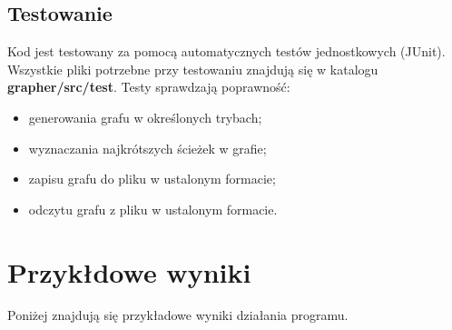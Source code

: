 \documentclass{article}
\begin{document}
\subsection{Testowanie}
Kod jest testowany za pomocą automatycznych testów jednostkowych (JUnit). Wszystkie pliki potrzebne przy testowaniu znajdują się w katalogu \linebreak \textbf{grapher/src/test}. Testy sprawdzają poprawność:
\begin{itemize}
    \item generowania grafu w określonych trybach;
    \item wyznaczania najkrótszych ścieżek w grafie;
    \item zapisu grafu do pliku w ustalonym formacie;
    \item odczytu grafu z pliku w ustalonym formacie.
\end{itemize}

\section{Przykłdowe wyniki}
Poniżej znajdują się przykładowe wyniki działania programu.
\end{document}
